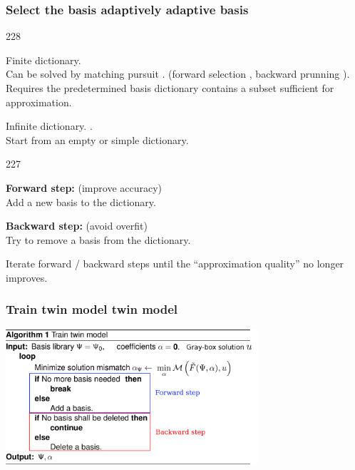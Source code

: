 \documentclass{beamer}
\let\oldcite=\cite
\renewcommand{\cite}[1]{\textcolor[rgb]{.4,.4,.85}{\oldcite{#1}}}
\newcommand{\barrow}{\item[\color{darkred}\ding{228}]}
\newcommand{\carrow}{\item[\color{darkred}\ding{227}]}
\begin{document}
\begin{frame}
    \frametitle{Select the basis adaptively \hfill \scriptsize{adaptive basis}}\small
    \begin{dinglist}{228}
        \barrow Finite dictionary.  \\
                Can be solved by matching pursuit \scriptsize{\cite{Mallat 93}}\small.
                (forward selection \scriptsize{\cite{Friedman 94}} \small, 
                backward prunning \scriptsize \cite{Reed 93} \small).\\
                \vspace{.2cm}
                Requires the predetermined basis dictionary contains a subset sufficient
                for approximation.
        \vspace{.3cm}
        \barrow Infinite dictionary.
                 \scriptsize
                \cite{Jekabsons 10, Blatman 10} \small.\\
                \vspace{.2cm}
                Start from an empty or simple dictionary.
                \begin{dinglist}{227}
                    \carrow \textbf{Forward step:} (improve accuracy)\\
                    Add a new basis to the dictionary.
                    \carrow \textbf{Backward step:} (avoid overfit)\\
                    Try to remove a basis from the dictionary.
                \end{dinglist}
                Iterate forward / backward steps until the ``approximation quality'' no longer improves.
    \end{dinglist}
\end{frame}

\begin{frame}
    \frametitle{Train twin model \hfill \scriptsize{twin model}}\small
    \begin{center}
        \includegraphics[height=5cm]{algo1.png}
    \end{center}
\end{frame}
\end{document}
